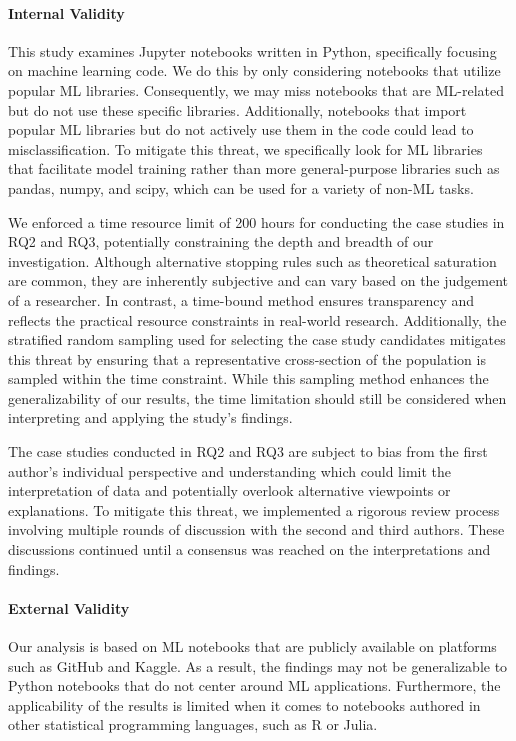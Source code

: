\documentclass[smallextended]{svjour3}       %
\begin{document}
\paragraph{\textbf{Internal Validity}} This study examines Jupyter notebooks written in Python, specifically focusing on machine learning code. We do this by only considering notebooks that utilize popular ML libraries. Consequently, we may miss notebooks that are ML-related but do not use these specific libraries. Additionally, notebooks that import popular ML libraries but do not actively use them in the code could lead to misclassification. To mitigate this threat, we specifically look for ML libraries that facilitate model training rather than more general-purpose libraries such as pandas, numpy, and scipy, which can be used for a variety of non-ML tasks.

We enforced a time resource limit of 200 hours for conducting the case studies in RQ2 and RQ3, potentially constraining the depth and breadth of our investigation. Although alternative stopping rules such as theoretical saturation are common, they are inherently subjective and can vary based on the judgement of a researcher. In contrast, a time-bound method ensures transparency and reflects the practical resource constraints in real-world research. Additionally, the stratified random sampling used for selecting the case study candidates mitigates this threat by ensuring that a representative cross-section of the population is sampled within the time constraint. While this sampling method enhances the generalizability of our results, the time limitation should still be considered when interpreting and applying the study's findings.

The case studies conducted in RQ2 and RQ3 are subject to bias from the first author's individual perspective and understanding which could limit the interpretation of data and potentially overlook alternative viewpoints or explanations. To mitigate this threat, we implemented a rigorous review process involving multiple rounds of discussion with the second and third authors. These discussions continued until a consensus was reached on the interpretations and findings.

\paragraph{\textbf{External Validity}} Our analysis is based on ML notebooks that are publicly available on platforms such as GitHub and Kaggle. As a result, the findings may not be generalizable to Python notebooks that do not center around ML applications. Furthermore, the applicability of the results is limited when it comes to notebooks authored in other statistical programming languages, such as R or Julia.
\end{document}
